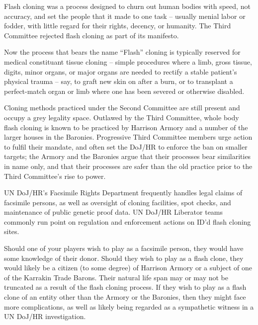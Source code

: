Flash cloning was a process designed to churn out human bodies with speed, not accuracy, and  
set the people that it made to one task -- usually menial labor or fodder, with little regard for their  
rights, decency, or humanity. The Third Committee rejected flash cloning as part of its manifesto. 
 

Now the process that bears the name “Flash” cloning is typically reserved for medical  
constituant tissue cloning -- simple procedures where a limb, gross tissue, digits, minor organs,  
or major organs are needed to rectify a stable patient’s physical trauma -- say, to graft new skin  
on after a burn, or to transplant a perfect-match organ or limb where one has been severed or  
otherwise disabled. 
 

Cloning methods practiced under the Second Committee are still present and occupy a grey  
legality space. Outlawed by the Third Committee, whole body flash cloning is known to be  
practiced by Harrison Armory and a number of the larger houses in the Baronies. Progressive  
Third Committee members urge action to fulfil their mandate, and often set the DoJ/HR to  
enforce the ban on smaller targets; the Armory and the Baronies argue that their processes bear  
similarities in name only, and that their processes are safer than the old practice prior to the Third  
Committee’s rise to power. 
 

UN DoJ/HR’s Facsimile Rights Department frequently handles legal claims of facsimile persons,  
as well as oversight of cloning facilities, spot checks, and maintenance of public genetic proof  
data. UN DoJ/HR Liberator teams commonly run point on regulation and enforcement actions on  
ID’d flash cloning sites. 
 

                                                                                                          


Should one of your players wish to play as a facsimile person, they would have some knowledge  
of their donor. Should they wish to play as a flash clone, they would likely be a citizen (to some  
degree) of Harrison Armory or a subject of one of the Karrakin Trade Barons. Their natural life  
span may or may not be truncated as a result of the flash cloning process. If they wish to play as  
a flash clone of an entity other than the Armory or the Baronies, then they might face more  
complications, as well as likely being regarded as a sympathetic witness in a UN DoJ/HR  
investigation. 
 
